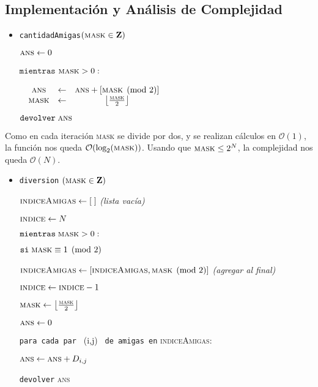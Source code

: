 \subsection{Implementación y Análisis de Complejidad}
\begin{itemize}
	\item \texttt{cantidadAmigas}$(\textsc{mask} \in \mathbf{Z})$
	
	$\textsc{ans} \leftarrow 0$
	
	$\texttt{mientras}$ $\textsc{mask} > 0:$

	$\begin{matrix}
	& \textsc{ans} & \leftarrow  & \textsc{ans} + \left [ \textsc{mask} \pmod{2}\right ] \\ 
	& \textsc{mask} & \leftarrow  & \left \lfloor \frac{\textsc{mask}}{2} \right \rfloor 
	\end{matrix}$
	
	$\texttt{devolver} \; \textsc{ans}$
\end{itemize}	
	Como en cada iteración \textsc{mask} se divide por dos, y se realizan cálculos en $\mathcal{O}(1)$, la función nos queda $\mathcal{O}(\text{log}_2(\textsc{mask}))$. Usando que $ \textsc{mask} \leq 2^N $, la complejidad nos queda $\mathcal{O}(N)$.
\begin{itemize}
	
	\item \texttt{diversion} $ (\textsc{mask} \in \mathbf{Z}) $
	
	$\textsc{indiceAmigas} \leftarrow [ \; ]$ \textit{(lista vacía)}
	
	$\textsc{indice} \leftarrow N$ 
	
	$\texttt{mientras} \; \textsc{mask} > 0:$
	
	\quad $ \texttt{si} \; \textsc{mask} \equiv 1 \pmod{2}$ 
	
	\quad \quad $ \textsc{indiceAmigas} \leftarrow [\textsc{indiceAmigas}, \textsc{mask} \pmod{2} ] $ \textit{(agregar al final)}
	
	\quad $\textsc{indice} \leftarrow \textsc{indice} - 1$
	
	\quad $\textsc{mask} \leftarrow \left \lfloor \frac{\textsc{mask}}{2} \right \rfloor$ 
	
	$\textsc{ans} \leftarrow 0$
	
	\texttt{para cada par } (i,j) \texttt{ de amigas en} \textsc{indiceAmigas}:
	
	\quad $\textsc{ans} \leftarrow \textsc{ans} + D_{i,j}$
	
	\texttt{devolver} \textsc{ans}

\end{itemize}


